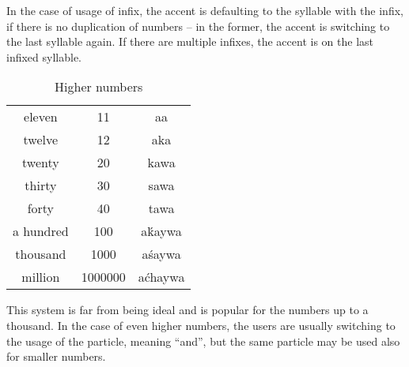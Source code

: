 
In the case of usage of  infix, the accent is defaulting to the syllable
with the infix, if there is no duplication of numbers -- in the former, the
accent is switching to the last syllable again. If there are multiple 
infixes, the accent is on the last infixed syllable.

\begin{table}[ht]
    \centering
    \caption{Higher numbers}
    \begin{tabular}{ccc} \toprule
        eleven    & 11      & aa      \\
        twelve    & 12      & aka     \\
        twenty    & 20      & kawa    \\
        thirty    & 30      & sawa    \\
        forty     & 40      & tawa    \\
        a hundred & 100     & aḱaywa  \\
        thousand  & 1000    & aśaywa  \\
        million   & 1000000 & aćhaywa \\\bottomrule
    \end{tabular}
    \label{tab:numerals2}
\end{table}

This system is far from being ideal and is popular for the numbers up to a
thousand. In the case of even higher numbers, the users are usually switching to
the usage of the  particle, meaning ``and'', but the same particle
may be used also for smaller numbers.





